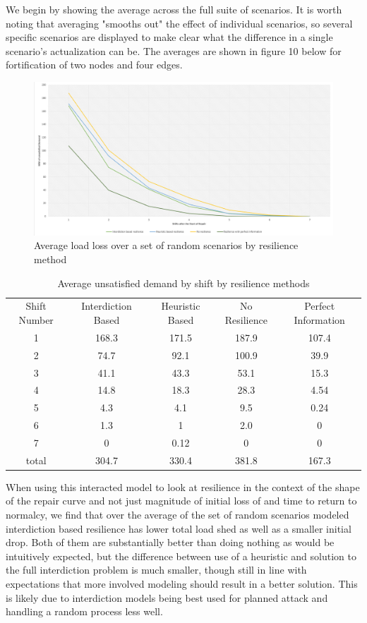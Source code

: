 \documentclass{article}
\begin{document}
We begin by showing the average across the full suite of scenarios. It is worth noting that averaging "smooths out" the effect of individual scenarios, so several specific scenarios are displayed to make clear what the difference in a single scenario's actualization can be. The averages are shown in figure 10 below for fortification of two nodes and four edges.	
\begin{figure}[htbp]
	\centering
	\includegraphics[width=.9\linewidth]{AverageSpaghetti.png}
	\caption{Average load loss over a set of random scenarios by resilience method}
\end{figure}

 \begin{table}[htbp]
	\centering
\begin{tabular}{|c|c|c|c|c|}
			\cline{1-5}
			Shift Number & Interdiction Based & Heuristic Based & No Resilience & Perfect Information\\
			1 & 168.3 & 171.5 & 187.9 & 107.4\\
			2 & 74.7 & 92.1 & 100.9 & 39.9\\
			3 & 41.1 & 43.3 & 53.1 & 15.3\\
			4 & 14.8 & 18.3 & 28.3 & 4.54\\
			5 & 4.3 & 4.1 & 9.5 & 0.24\\
			6 & 1.3 & 1 & 2.0 & 0\\
			7 & 0 & 0.12 & 0 & 0\\
			total & 304.7 & 330.4 & 381.8 & 167.3\\
			\hline
	\end{tabular}
	\caption{Average unsatisfied demand by shift by resilience methods}
	\label{time}
\end{table}


	When using this interacted model to look at resilience in the context of the shape of the repair curve and not just magnitude of initial loss of and time to return to normalcy, we find that over the average of the set of random scenarios modeled interdiction based resilience has lower total load shed as well as a smaller initial drop. Both of them are substantially better than doing nothing as would be intuitively expected, but the difference between use of a heuristic and solution to the full interdiction problem is much smaller, though still in line with expectations that more involved modeling should result in a better solution. This is likely due to interdiction models being best used for planned attack and handling a random process less well.
	
\end{document}
